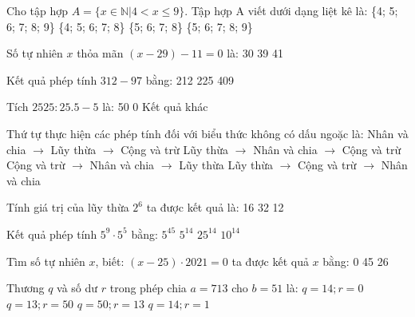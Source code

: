 \begin{ex}
Cho tập hợp $A=\{x\in\mathbb{N}|4<x\le9\}$. Tập hợp A viết dưới dạng liệt kê là:
\choice
{\{4; 5; 6; 7; 8; 9\}}
{\{4; 5; 6; 7; 8\}}
{\{5; 6; 7; 8\}}
{\True \{5; 6; 7; 8; 9\}}
\end{ex}

\begin{ex}
Số tự nhiên $x$ thỏa mãn $(x-29)-11=0$ là:
\choice
{30}
{39}
{}
{41}
\end{ex}

\begin{ex}
Kết quả phép tính $312 - 97$ bằng:
\choice
{212}
{}
{225}
{409}
\end{ex}

\begin{ex}
Tích $2525:25.5-5$ là:
\choice
{50}
{0}
{}
{Kết quả khác}
\end{ex}

\begin{ex}
Thứ tự thực hiện các phép tính đối với biểu thức không có dấu ngoặc là:
\choice
{Nhân và chia $\rightarrow$ Lũy thừa $\rightarrow$ Cộng và trừ}
{\True Lũy thừa $\rightarrow$ Nhân và chia $\rightarrow$ Cộng và trừ}
{Cộng và trừ $\rightarrow$ Nhân và chia $\rightarrow$ Lũy thừa}
{Lũy thừa $\rightarrow$ Cộng và trừ $\rightarrow$ Nhân và chia}
\end{ex}

\begin{ex}
Tính giá trị của lũy thừa $2^{6}$ ta được kết quả là:
\choice
{16}
{32}
{}
{12}
\end{ex}

\begin{ex}
Kết quả phép tính $5^{9} \cdot 5^{5}$ bằng:
\choice
{$5^{45}$}
{\True $5^{14}$}
{$25^{14}$}
{$10^{14}$}
\end{ex}

\begin{ex}
Tìm số tự nhiên $x$, biết: $(x - 25) \cdot 2021=0$ ta được kết quả $x$ bằng:
\choice
{0}
{45}
{}
{26}
\end{ex}

\begin{ex}
Thương $q$ và số dư $r$ trong phép chia $a=713$ cho $b=51$ là:
\choice
{$q=14; r=0$}
{\True $q=13; r=50$}
{$q=50; r=13$}
{$q=14; r=1$}
\end{ex}

